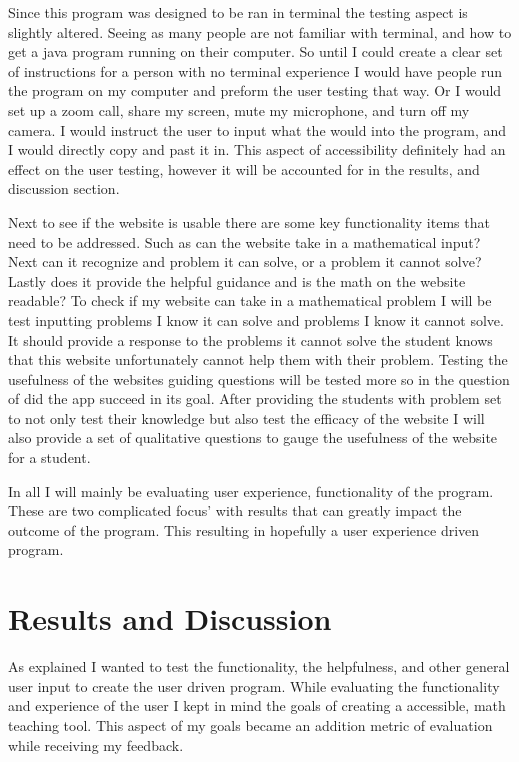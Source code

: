 \documentclass[10pt,twocolumn]{article}
\begin{document}
Since this program was designed to be ran in terminal the testing aspect is slightly altered. Seeing as many people are not familiar with terminal, and how to get a java program running on their computer. So until I could create a clear set of instructions for a person with no terminal experience I would have people run the program on my computer and preform the user testing that way. Or I would set up a zoom call, share my screen, mute my microphone, and turn off my camera. I would instruct the user to input what the would into the program, and I would directly copy and past it in. This aspect of accessibility definitely had an effect on the user testing, however it will be accounted for in the  results, and discussion section.

Next to see if the website is usable there are some key functionality items that need to be addressed. Such as can the website take in a mathematical input? Next can it recognize and problem it can solve, or a problem it cannot solve? Lastly does it provide the helpful guidance and is the math on the website readable? To check if my website can take in a mathematical problem I will be test inputting problems I know it can solve and problems I know it cannot solve. It should provide a response to the problems it cannot solve the student knows that this website unfortunately cannot help them with their problem. Testing the usefulness of the websites guiding questions will be tested more so in the question of did the app succeed in its goal. After providing the students with problem set to not only test their knowledge but also test the efficacy of the website I will also provide a set of qualitative questions to gauge the usefulness of the website for a student.

In all I will mainly be evaluating user experience, functionality of the program. These are two complicated focus' with results that can greatly impact the outcome of the program. This resulting in hopefully a user experience driven program. 
\section{Results and Discussion}
As explained I wanted to test the functionality, the helpfulness, and other general user input to create the user driven program. While evaluating the functionality and experience of the user I kept in mind the goals of creating a accessible, math teaching tool. This aspect of my goals became an addition metric of evaluation while receiving my feedback. 
\end{document}
